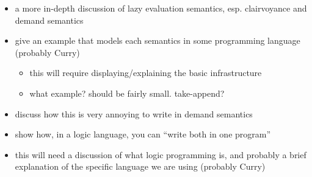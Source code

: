 \begin{itemize}
  \item a more in-depth discussion of lazy evaluation semantics, esp.
        clairvoyance and demand semantics
  \item give an example that models each semantics in some programming language
        (probably Curry)
  \begin{itemize}
    \item this will require displaying/explaining the basic infrastructure
    \item what example? should be fairly small. take-append?
  \end{itemize}
  \item discuss how this is very annoying to write in demand semantics
  \item show how, in a logic language, you can ``write both in one program''
  \item this will need a discussion of what logic programming is, and probably a
        brief explanation of the specific language we are using (probably Curry)
\end{itemize}


